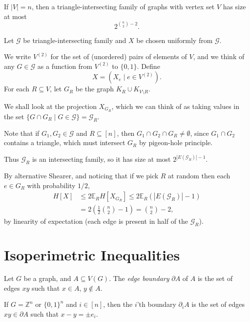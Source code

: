 \documentclass[12pt]{article}
\begin{document}
\begin{theorem}
	If $|V| = n$, then a triangle-intersecting family of graphs with vertex set $V$ has size at most
	\[
	2^{\binom n2 - 2}.
	\]
\end{theorem}

\begin{proofbox}
	Let $ \mathcal{G}$ be triangle-intersecting family and $X$ be chosen uniformly from $\mathcal{G}$.

	We write $V^{(2)}$ for the set of (unordered) pairs of elements of $V$, and we think of any $G \in \mathcal{G}$ as a function from $V^{(2)}$ to $\{0, 1\}$. Define 
	\[
	X = (X_e \mid e \in V^{(2)}).
	\]
	For each $R \subseteq V$, let $G_R$ be the graph $K_R \cup K_{V \setminus R}$.

	We shall look at the projection $X_{G_R}$, which we can think of as taking values in the set $\{G \cap G_R \mid G \in \mathcal{G}\} = \mathcal{G}_R$.

	Note that if $G_1, G_2 \in \mathcal{G}$ and $R \subseteq [n]$, then $G_1 \cap G_2 \cap G_R \neq \emptyset$, since $G_1 \cap G_2$ contains a triangle, which must intersect $G_R$ by pigeon-hole principle.

	Thus $\mathcal{G}_R$ is an intersecting family, so it has size at most $2^{|E(\mathcal{G}_R)| - 1}$.

	By alternative Shearer, and noticing that if we pick $R$ at random then each $e \in G_R$ with probability $1/2$,
	\begin{align*}
		H[X] &\leq 2 \mathbb{E}_R H[X_{G_R}] \leq 2 \mathbb{E}_R (|E(\mathcal{G}_R)| - 1) \\
		     &= 2 \left( \frac 12 \binom n2 - 1 \right) = \binom n2 - 2,
	\end{align*}
	by linearity of expectation (each edge is present in half of the $\mathcal{G}_R$).
\end{proofbox}


\newpage

\section{Isoperimetric Inequalities}%
\label{sec:ii}

\begin{definition}
	Let $G$ be a graph, and $A \subseteq V(G)$. The \emph{edge boundary} $\partial A$ of $A$ is the set of edges $xy$ such that $x \in A$, $y \not \in A$.

	If $G = \mathbb{Z}^{n}$ or $\{0,1\}^{n}$ and $i \in [n]$, then the $i$'th boundary $\partial_i A$ is the set of edges $xy \in \partial A$ such that $x - y = \pm e_i$.
\end{definition}
\end{document}
